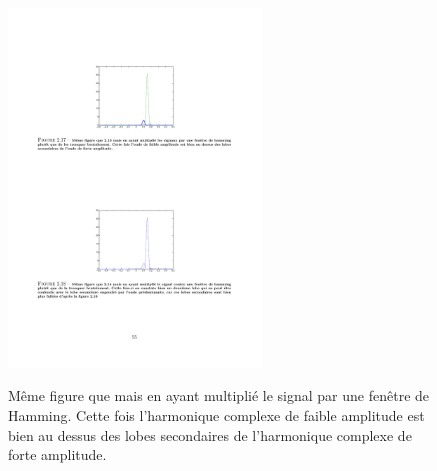 \begin{figure}
  \centering
  \includegraphics[width=0.6\textwidth]{Figures/Figure2-17}\\
  \caption{M\^{e}me figure que  mais en ayant multipli\'{e} le signal par une fen\^{e}tre de Hamming. Cette fois l'harmonique complexe de faible amplitude est bien au dessus des lobes secondaires de l'harmonique complexe de forte amplitude.}\label{fig:figure2-17}
\end{figure}


